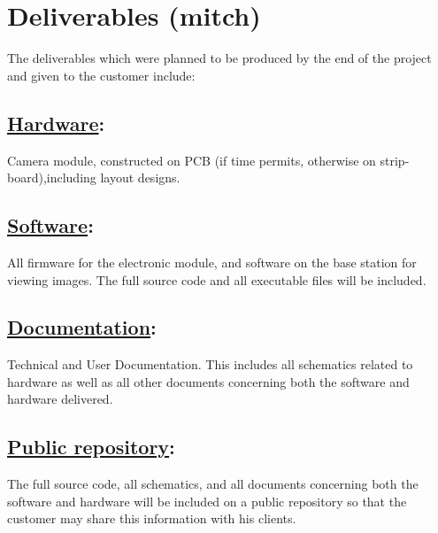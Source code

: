 \section{Deliverables (mitch)}

The deliverables which were planned to be produced by the end of the project and given to the customer include:

	\subsection{\underline{Hardware}:} 
	\label{sec:deliv_hw} 
	Camera module, constructed on PCB (if time permits, otherwise on strip-board),including layout designs.
	\subsection{\underline{Software}:} 
	\label{sec:deliv_sw} 
	All firmware for the electronic module, and software on the base station for viewing images. The full source code and all executable files will be included.
	\subsection{\underline{Documentation}:} 
	\label{sec:deliv_doc} 
	Technical and User Documentation. This includes all schematics related to hardware as well as all other documents concerning both the software and hardware delivered.
	\subsection{\underline{Public repository}:} 
	\label{sec:deliv_git} 
	The full source code, all schematics, and all documents concerning both the software and hardware will be included on a public repository so that the customer may share this information with his clients.

